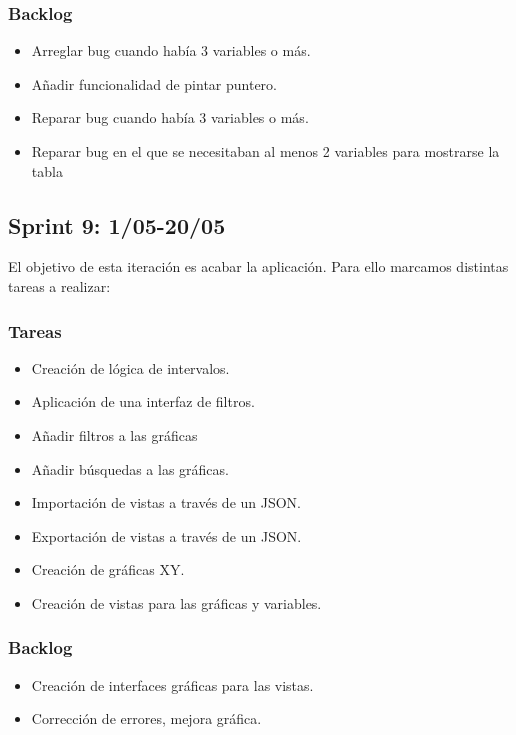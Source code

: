 \subsubsection{Backlog}

\begin{itemize}
	\item Arreglar bug cuando había 3 variables o más. 

	\item Añadir funcionalidad de pintar puntero.

	\item Reparar bug cuando había 3 variables o más.

	\item Reparar bug en el que se necesitaban al menos 2 variables para mostrarse la tabla

\end{itemize}




\subsection{Sprint 9: 1/05-20/05}

El objetivo de esta iteración es acabar la aplicación. Para ello marcamos distintas tareas a realizar:
\subsubsection{Tareas}
\begin{itemize}
\item Creación de lógica de intervalos.

\item Aplicación de una interfaz de filtros.

\item Añadir filtros a las gráficas

\item Añadir búsquedas a las gráficas.


\item Importación de vistas a través de un JSON.

\item Exportación de vistas a través de un JSON.


\item Creación de gráficas XY.

\item Creación de vistas para las gráficas y variables.
\end{itemize}
\subsubsection{Backlog}
\begin{itemize}
\item Creación de interfaces gráficas para las vistas.

\item Corrección de errores, mejora gráfica.
\end{itemize}

